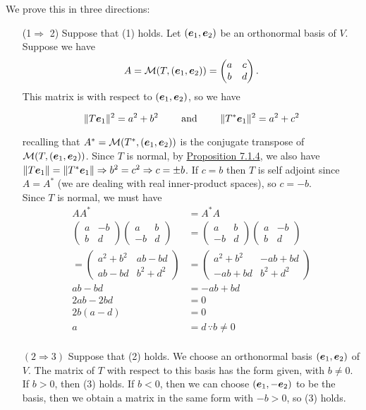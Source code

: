 \documentclass{report}
\newcommand{\cM}{\mathcal{M}}
\begin{document}
	\begin{myproof}
		We prove this in three directions:
		\begin{enumerate}
			\item[(1$\Rightarrow$ 2)] Suppose that (1) holds. Let $(\boldsymbol{e}_1,\boldsymbol{e}_2)$ be an orthonormal basis of $V$. Suppose we have
			$$A=\cM(T,(\bme_1,\bme_2))=\begin{pmatrix}
				a & c\\b & d
			\end{pmatrix}.$$
			This matrix is with respect to $(\boldsymbol{e}_1,\boldsymbol{e}_2)$, so we have 
			
			$$\|T\boldsymbol{e}_1\|^2=a^2+b^2 \quad\quad\text{ and }\quad\quad \|T^*\boldsymbol{e}_1\|^2=a^2+c^2$$
			
			recalling that $A^*=\cM(T^*,(\bme_1,\bme_2))$ is the conjugate transpose of $\cM(T,(\bme_1,\bme_2))$. Since $T$ is normal, by \hyperref[sec:Prop4]{Proposition 7.1.4}, we also have $\|T\boldsymbol{e}_1\|=\|T^*\boldsymbol{e}_1\|\Rightarrow b^2=c^2 \Rightarrow c=\pm b$. If $c=b$ then $T$ is self adjoint since $A=A^*$ (we are dealing with real inner-product spaces), so $c=-b$.\\
			
			Since $T$ is normal, we must have 
			\begin{align*}
				AA^*&=A^*A\\
				\begin{pmatrix}
					a & -b \\ b & d
				\end{pmatrix}\begin{pmatrix}
				a & b \\ -b & d
				\end{pmatrix}&=\begin{pmatrix}
				a & b \\ -b & d
				\end{pmatrix}\begin{pmatrix}
				a & -b \\ b & d
				\end{pmatrix}\\
			=\begin{pmatrix}
			a^2+b^2 & ab-bd \\ ab-bd & b^2+d^2
			\end{pmatrix}&=\begin{pmatrix}
			a^2+b^2 & -ab+bd \\ -ab+bd & b^2+d^2
			\end{pmatrix}\\
			ab-bd&=-ab+bd\\
			2ab-2bd&=0\\
			2b(a-d)&=0\\
			a&=d \,\because b\neq 0\\
			\end{align*}
			\item[$(2\Rightarrow 3)$] Suppose that (2) holds. We choose an orthonormal basis $(\boldsymbol{e}_1,\boldsymbol{e}_2)$ of $V$. The matrix of $T$ with respect to this basis has the form given, with $b\neq 0$. If $b>0$, then (3) holds. If $b<0$, then we can choose $(\boldsymbol{e}_1,-\boldsymbol{e}_2)$ to be the basis, then we obtain a matrix in the same form with $-b>0$, so (3) holds.\\
			

\end{enumerate}
\end{myproof}
\end{document}
